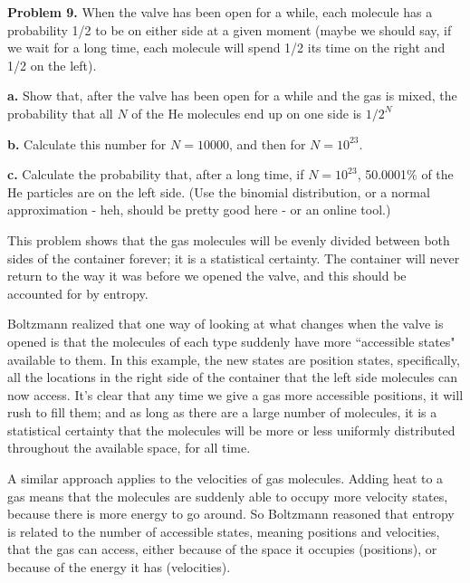 \documentclass[12pt]{article}
\begin{document}
\textbf{Problem 9.} When the valve has been open for a while, each molecule has a probability 1/2 to be on either side at a given moment (maybe we should say, if we wait for a long time, each molecule will spend 1/2 its time on the right and 1/2 on the left). 

\textbf{a.} Show that, after the valve has been open for a while and the gas is mixed, the probability that all $N$ of the He molecules end up on one side is $1/2^{N}$

\textbf{b.} Calculate this number for $N=10000$, and then for $N=10^{23}$. 

\textbf{c.} Calculate the probability that, after a long time, if $N=10^{23}$, 50.0001\% of the He particles are on the left side. (Use the binomial distribution, or a normal approximation - heh, should be pretty good here - or an online tool.)

This problem shows that the gas molecules will be evenly divided between both sides of the container forever; it is a statistical certainty. The container will never return to the way it was before we opened the valve, and this should be accounted for by entropy. 

Boltzmann realized that one way of looking at what changes when the valve is opened is that the molecules of each type suddenly have more ``accessible states" available to them. In this example, the new states are position states, specifically, all the locations in the right side of the container that the left side molecules can now access. It's clear that any time we give a gas more accessible positions, it will rush to fill them; and as long as there are a large number of molecules, it is a statistical certainty that the molecules will be more or less uniformly distributed throughout the available space, for all time.

A similar approach applies to the velocities of gas molecules. Adding heat to a gas means that the molecules are suddenly able to occupy more velocity states, because there is more energy to go around. So Boltzmann reasoned that entropy is related to the number of accessible states, meaning positions and velocities, that the gas can access, either because of the space it occupies (positions), or because of the energy it has (velocities). 
\end{document}
